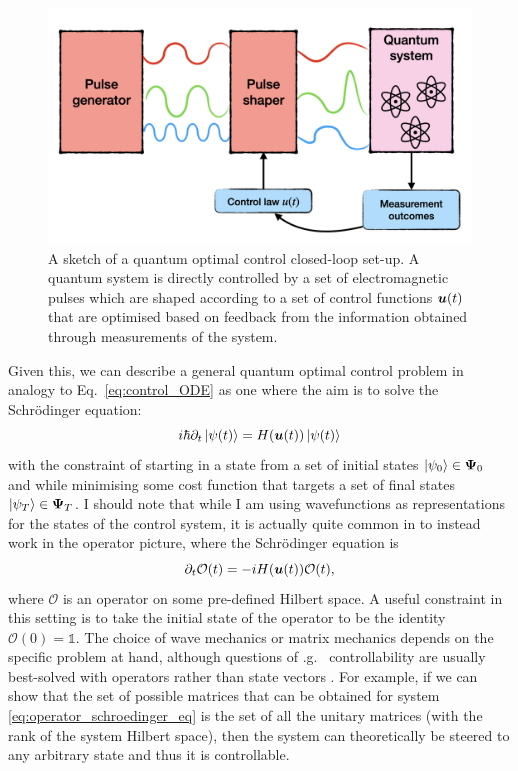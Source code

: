 \begin{figure}[t]
\centering
\includegraphics[width=0.8\linewidth]{images/optimal_control_placeholder.png} \caption[Schematic diagram of open-loop quantum optimal control]{A sketch of a quantum optimal control closed-loop set-up. A quantum system is directly controlled by a set of electromagnetic pulses which are shaped according to a set of control functions $\boldsymbol{u}(t)$ that are optimised based on feedback from the information obtained through measurements of the system.}\label{fig:quantum_optimal_control}
\end{figure}

Given this, we can describe a general quantum optimal control problem in analogy to Eq.~\eqref{eq:control_ODE} as one where the aim is to solve the Schr\"{o}dinger equation:
\begin{equation}\label{eq:optimal_control_schroedinger}
    i \hbar \partial_t \ket{\psi(t)} = H(\boldsymbol{u}(t))\ket{\psi(t)}
\end{equation}
with the constraint of starting in a state from a set of initial states $\ket{\psi_0} \in \boldsymbol \Psi_0$ and while minimising some cost function that targets a set of final states $\ket{\psi_T} \in \boldsymbol \Psi_T$. I should note that while I am using wavefunctions as representations for the states of the control system, it is actually quite common in  to instead work in the operator picture, where the Schr\"{o}dinger equation is
\begin{equation}\label{eq:operator_schroedinger_eq}
    \partial_t \mathcal{O}(t) = -i H(\boldsymbol{u}(t))\mathcal{O}(t),
\end{equation}
where $\mathcal{O}$ is an operator on some pre-defined Hilbert space. A useful constraint in this setting is to take the initial state of the operator to be the identity $\mathcal{O}(0) = \mathds{1}$. The choice of wave mechanics or matrix mechanics depends on the specific  problem at hand, although questions of \@e.g.~ controllability are usually best-solved with operators rather than state vectors . For example, if we can show that the set of possible matrices that can be obtained for system \eqref{eq:operator_schroedinger_eq} is the set of all the unitary matrices (with the rank of the system Hilbert space), then the system can theoretically be steered to any arbitrary state and thus it is controllable.

